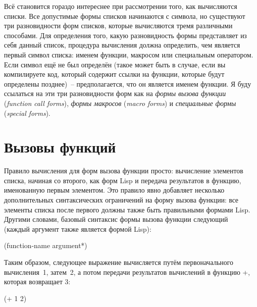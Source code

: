 Всё становится гораздо интереснее при рассмотрении того, как вычисляются списки. Все
допустимые формы списков начинаются с символа, но существуют три разновидности форм
списков, которые вычисляются тремя различными способами. Для определения того, какую
разновидность формы представляет из себя данный список, процедура вычисления должна
определить, чем является первый символ списка: именем функции, макросом или специальным
оператором. Если символ ещё не был определён (такое может быть в случае, если вы
компилируете код, который содержит ссылки на функции, которые будут определены позднее)~--
предполагается, что он является именем функции. Я буду ссылаться на эти три разновидности форм как на \textit{формы
  вызова функции} (\textit{function call forms}), \textit{формы макросов} (\textit{macro
  forms}) и \textit{специальные формы} (\textit{special forms}).

\section{Вызовы функций}

Правило вычисления для форм вызова функции просто: вычисление элементов списка, начиная со
второго, как форм Lisp и передача результатов в функцию, именованную первым элементом. Это
правило явно добавляет несколько дополнительных синтаксических ограничений на форму вызова
функции: все элементы списка после первого должны также быть правильными формами
Lisp. Другими словами, базовый синтаксис формы вызова функции следующий (каждый аргумент
также является формой Lisp):

\begin{myverb}
(function-name argument*)
\end{myverb}

Таким образом, следующее выражение вычисляется путём первоначального вычисления~1,
затем~2, а потом передачи результатов вычислений в функцию +, которая возвращает 3:

\begin{myverb}
(+ 1 2)
\end{myverb}

